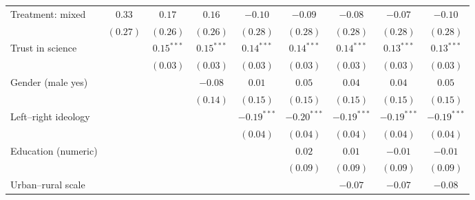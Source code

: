 \begin{table}[h]
\begin{center}
\begin{tabular}{l c c c c c c c c}
Treatment: mixed                                                                & $0.33$       & $0.17$       & $0.16$       & $-0.10$       & $-0.09$       & $-0.08$       & $-0.07$       & $-0.10$       \\
                                                                                & $(0.27)$     & $(0.26)$     & $(0.26)$     & $(0.28)$      & $(0.28)$      & $(0.28)$      & $(0.28)$      & $(0.28)$      \\
Trust in science                                                                &              & $0.15^{***}$ & $0.15^{***}$ & $0.14^{***}$  & $0.14^{***}$  & $0.14^{***}$  & $0.13^{***}$  & $0.13^{***}$  \\
                                                                                &              & $(0.03)$     & $(0.03)$     & $(0.03)$      & $(0.03)$      & $(0.03)$      & $(0.03)$      & $(0.03)$      \\
Gender (male yes)                                                               &              &              & $-0.08$      & $0.01$        & $0.05$        & $0.04$        & $0.04$        & $0.05$        \\
                                                                                &              &              & $(0.14)$     & $(0.15)$      & $(0.15)$      & $(0.15)$      & $(0.15)$      & $(0.15)$      \\
Left–right ideology                                                             &              &              &              & $-0.19^{***}$ & $-0.20^{***}$ & $-0.19^{***}$ & $-0.19^{***}$ & $-0.19^{***}$ \\
                                                                                &              &              &              & $(0.04)$      & $(0.04)$      & $(0.04)$      & $(0.04)$      & $(0.04)$      \\
Education (numeric)                                                             &              &              &              &               & $0.02$        & $0.01$        & $-0.01$       & $-0.01$       \\
                                                                                &              &              &              &               & $(0.09)$      & $(0.09)$      & $(0.09)$      & $(0.09)$      \\
Urban–rural scale                                                               &              &              &              &               &               & $-0.07$       & $-0.07$       & $-0.08$       \\

\end{tabular}
\end{center}
\end{table}
